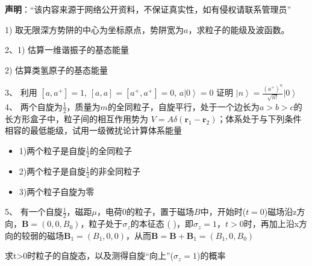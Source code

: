 
\textbf{声明}：“该内容来源于网络公开资料，不保证真实性，如有侵权请联系管理员”


1) 取无限深方势阱的中心为坐标原点，势阱宽为$a$，求粒子的能级及波函数。

2、1) 估算一维谐振子的基态能量

2) 估算类氢原子的基态能量

3、 利用 $[a,a^+]=1$, \quad $[a,a]=[a^+,a^+]=0$, \quad $a \left| 0 \right\rangle =0$ 证明 $\left| n \right\rangle = \frac{(a^+)^n}{\sqrt{n!}} \left| 0 \right\rangle$\\
4、 两个自旋为$\frac{1}{2}$，质量为$m$的全同粒子，自旋平行，处于一个边长为$a>b>c$的长方形盒子中，粒子间的相互作用势为 $V=A\delta (\mathbf{r}_1 - \mathbf{r}_2)$；体系处于与下列条件相容的最低能级，试用一级微扰论计算体系能量

\begin{itemize}
    \item 1)两个粒子是自旋$\frac{1}{2}$的全同粒子
    \item 2)两个粒子是自旋$\frac{1}{2}$的非全同粒子
    \item 3)两个粒子自旋为零
\end{itemize}

5、 有一个自旋$\frac{1}{2}$，磁距$\mu$，电荷0的粒子，置于磁场$B$中，开始时($t=0$)磁场沿z方向，$\mathbf{B}= \left( 0, 0, B_0 \right)$，粒子处于$\sigma_z$的本征态 (  )，即$\sigma_z = 1$，$t>0$时，再加上沿x方向的较弱的磁场$\mathbf{B}_1 = \left( B_1, 0, 0 \right)$，从而$\mathbf{B} = \mathbf{B} + \mathbf{B}_1 = \left( B_1, 0, B_0 \right)$

求t>0时粒子的自旋态，以及测得自旋“向上”($\sigma_z=1$)的概率

